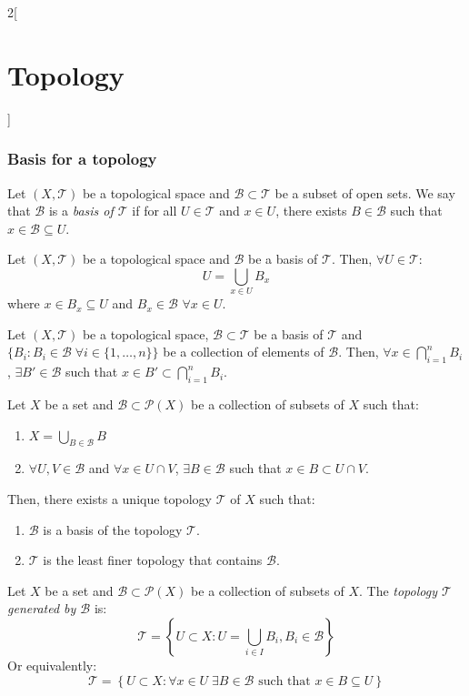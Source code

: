 \documentclass[../../../main.tex]{subfiles}
\begin{document}
\begin{multicols}{2}[\section{Topology}]
  \subsubsection{Basis for a topology}
  \begin{definition}
    Let $(X,\mathcal{T})$ be a topological space and $\mathcal{B}\subset\mathcal{T}$ be a subset of open sets. We say that $\mathcal{B}$ is a \textit{basis of $\mathcal{T}$} if for all $U\in\mathcal{T}$ and $x\in U$, there exists $B\in\mathcal{B}$ such that $x\in\mathcal{B}\subseteq U$.
  \end{definition}
  \begin{prop}
    Let $(X,\mathcal{T})$ be a topological space and $\mathcal{B}$ be a basis of $\mathcal{T}$. Then, $\forall U\in\mathcal{T}$: $$U=\bigcup_{x\in U}B_x$$ where $x\in B_x\subseteq U$ and $B_x\in\mathcal{B}$ $\forall x\in U$.
  \end{prop}
  \begin{lemma}
    Let $(X,\mathcal{T})$ be a topological space, $\mathcal{B}\subset\mathcal{T}$ be a basis of $\mathcal{T}$ and $\{B_i:B_i\in\mathcal{B}\;\forall i\in \{1,\ldots,n\}\}$ be a collection of elements of $\mathcal{B}$. Then, $\forall x\in\bigcap_{i=1}^nB_i$, $\exists B'\in\mathcal{B}$ such that $x\in B'\subset\bigcap_{i=1}^nB_i$.
  \end{lemma}
  \begin{prop}
    Let $X$ be a set and $\mathcal{B}\subset\mathcal{P}(X)$ be a collection of subsets of $X$ such that:
    \begin{enumerate}
      \renewcommand{\labelenumi}{\alph{enumi})}
      \item $\displaystyle X=\bigcup_{B\in\mathcal{B}} B$
      \item $\forall U,V\in\mathcal{B}$ and  $\forall x\in U\cap V$, $\exists B\in\mathcal{B}$ such that $x\in B\subset U\cap V$.
    \end{enumerate}
    Then, there exists a unique topology $\mathcal{T}$ of $X$ such that:
    \begin{enumerate}
      \item $\mathcal{B}$ is a basis of the topology $\mathcal{T}$.
      \item $\mathcal{T}$ is the least finer topology that contains $\mathcal{B}$.
    \end{enumerate}
  \end{prop}
  \begin{definition}
    Let $X$ be a set and $\mathcal{B}\subset\mathcal{P}(X)$ be a collection of subsets of $X$. The \textit{topology $\mathcal{T}$ generated by $\mathcal{B}$} is: $$\mathcal{T}=\left\{U\subset X:U=\bigcup_{i\in I}B_i, B_i\in \mathcal{B}\right\}$$ Or equivalently: $$\mathcal{T}=\left\{U\subset X:\forall x\in U\;\exists B\in\mathcal{B}\text{ such that }x\in B\subseteq U\right\}$$

\end{definition}
\end{multicols}
\end{document}
